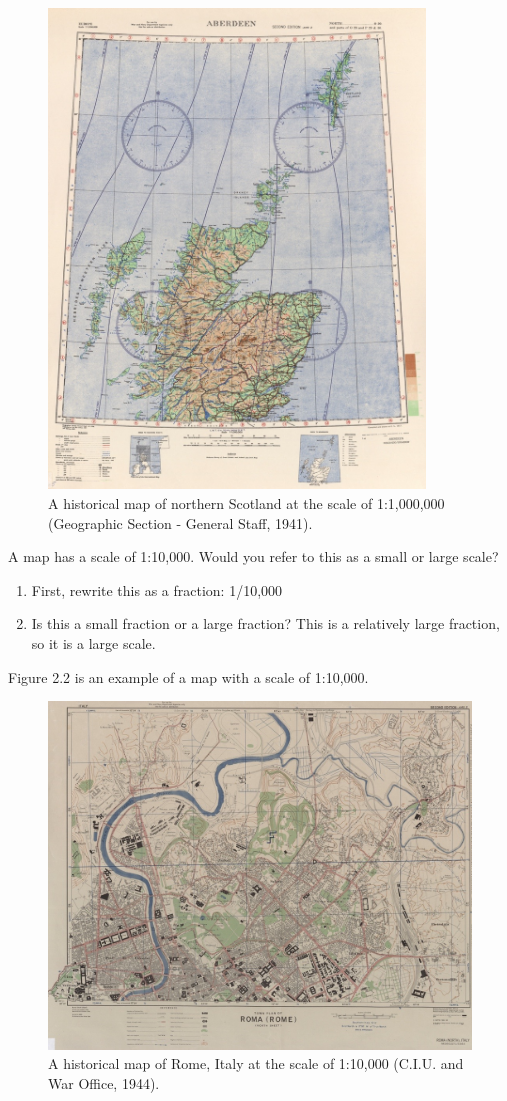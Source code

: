 \documentclass[a4paper , 12pt]{book}
\begin{document}
\begin{figure}[ht]
    \centering
    \includegraphics[width=10cm]{Figures/ch2f1.jpg}
    \caption{A historical map of northern Scotland at the scale of 1:1,000,000 (Geographic Section - General Staff, 1941).}
\end{figure}

A map has a scale of 1:10,000. Would you refer to this as a small or large scale?

\begin{enumerate}
    \item First, rewrite this as a fraction: 1/10,000
    \item Is this a small fraction or a large fraction? This is a relatively large fraction, so it is a large scale. 
\end{enumerate}

Figure 2.2 is an example of a map with a scale of 1:10,000.

\begin{figure}[ht]
    \centering
    \includegraphics[width=12cm]{Figures/ch2f2.jpg}
    \caption{A historical map of Rome, Italy at the scale of 1:10,000 (C.I.U. and War Office, 1944).}
\end{figure}
\end{document}
